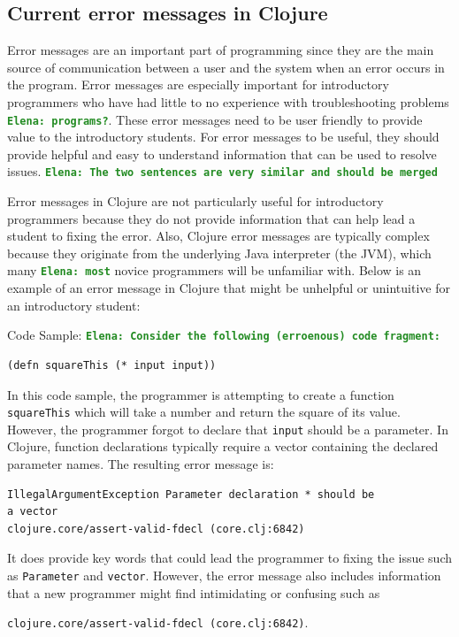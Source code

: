 \documentclass[12pt]{article}
\newcommand{\comment}[1]{{\bf \tt  {#1}}}
\newcommand{\emcomment}[1]{\textcolor{ForestGreen}{\comment{Elena: {#1}}}}
\begin{document}
\subsection{Current error messages in Clojure}\label{sec:currentem}
Error messages are an important part of programming since they are the main source of communication between a user and the system when an error occurs in the program.
Error messages are especially important for introductory programmers who have had little to no experience with troubleshooting problems \emcomment{programs?}.
These error messages need to be user friendly to provide value to the introductory students.
For error messages to be useful, they should provide helpful and easy to understand information that can be used to resolve issues. 
\emcomment{The two sentences are very similar and should be merged}

Error messages in Clojure are not particularly useful for introductory programmers because they do not provide information that can help lead a student to fixing the error.
Also, Clojure error messages are typically complex because they originate from the underlying Java interpreter (the JVM), which many \emcomment{most} novice programmers will be unfamiliar with.
Below is an example of an error message in Clojure that might be unhelpful or unintuitive for an introductory student:

Code Sample:
\emcomment{Consider the following (erroenous) code fragment:}
\begin{verbatim}
(defn squareThis (* input input))
\end{verbatim}

In this code sample, the programmer is attempting to create a function \texttt{squareThis} which will take a number and return the square of its value.
However, the programmer forgot to declare that \texttt{input} should be a parameter.
In Clojure, function declarations typically require a vector containing the declared parameter names.
The resulting error message is: 
\begin{verbatim}
IllegalArgumentException Parameter declaration * should be 
a vector 
clojure.core/assert-valid-fdecl (core.clj:6842)
\end{verbatim}
It does provide key words that could lead the programmer to fixing the issue such as \texttt{Parameter} and \texttt{vector}.
However, the error message also includes information that a new programmer might find intimidating or confusing such as 

\noindent
\texttt{clojure.core/assert-valid-fdecl (core.clj:6842)}.
\end{document}
